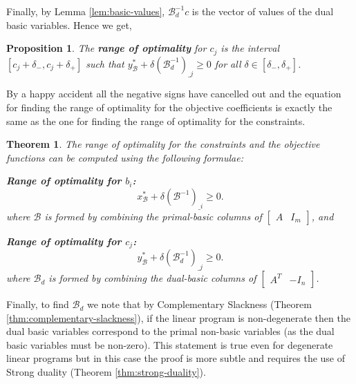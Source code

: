 \documentclass[
]{book}
\newtheorem{theorem}{Theorem}[chapter]
\newtheorem{proposition}{Proposition}[chapter]
\theoremstyle{definition}
\theoremstyle{definition}
\theoremstyle{definition}
\theoremstyle{definition}
\theoremstyle{remark}
\begin{document}
Finally, by Lemma \ref{lem:basic-values}, \(\mathcal{B}_d^{-1} c\) is the vector of values of the dual basic variables. Hence we get,

\begin{proposition}
The \textbf{range of optimality} for \(c_j\) is the interval \([c_j + \delta_-, c_j + \delta_+]\) such that \(y_{\mathcal{B}}^* + \delta (\mathcal{B}_d^{-1})_{\_j} \ge 0\) for all \(\delta \in [\delta_-, \delta_+]\).
\end{proposition}

By a happy accident all the negative signs have cancelled out and the equation for finding the range of optimality for the objective coefficients is exactly the same as the one for finding the range of optimality for the constraints.

\begin{theorem}
\protect\hypertarget{thm:range-of-optimality}{}\label{thm:range-of-optimality}The range of optimality for the constraints and the objective functions can be computed using the following formulae:

\textbf{Range of optimality for \(b_i\):}
\begin{equation}
  x_{\mathcal{B}}^* + \delta (\mathcal{B}^{-1})_{\_i} \ge 0.
\end{equation}
where \(\mathcal{B}\) is formed by combining the primal-basic columns of \(\begin{bmatrix} A & I_m \end{bmatrix}\), and

\textbf{Range of optimality for \(c_j\):}
\begin{equation}
  y_{\mathcal{B}}^* + \delta (\mathcal{B}_d^{-1})_{\_j} \ge 0.
\end{equation}
where \(\mathcal{B}_d\) is formed by combining the dual-basic columns of \(\begin{bmatrix} A^T & -I_n \end{bmatrix}\).
\end{theorem}

Finally, to find \(\mathcal{B}_d\) we note that by Complementary Slackness (Theorem \ref{thm:complementary-slackness}), if the linear program is non-degenerate then the dual basic variables correspond to the primal non-basic variables (as the dual basic variables must be non-zero). This statement is true even for degenerate linear programs but in this case the proof is more subtle and requires the use of Strong duality (Theorem \ref{thm:strong-duality}).
\end{document}
